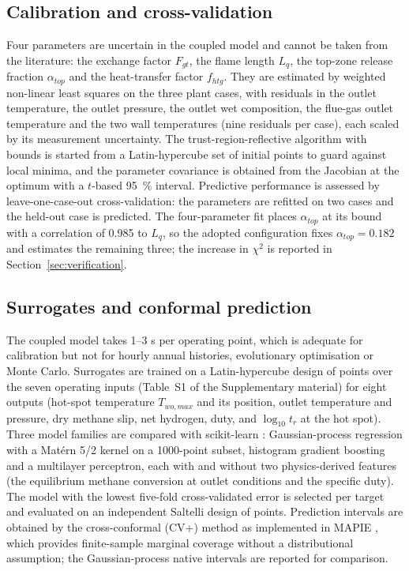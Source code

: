 \subsection{Calibration and cross-validation}
\label{sec:calibration}

Four parameters are uncertain in the coupled model and cannot be taken from the literature: the exchange factor $F_{gt}$, the flame
length $L_q$, the top-zone release fraction $\alpha_{top}$ and the heat-transfer factor $f_{htg}$. They are estimated by weighted
non-linear least squares on the three plant cases, with residuals in the outlet temperature, the outlet pressure, the outlet wet
composition, the flue-gas outlet temperature and the two wall temperatures (nine residuals per case), each scaled by its
measurement uncertainty. The trust-region-reflective algorithm with bounds is started from a Latin-hypercube set of initial points
to guard against local minima, and the parameter covariance is obtained from the Jacobian at the optimum with a $t$-based
\SI{95}{\percent} interval. Predictive performance is assessed by leave-one-case-out cross-validation: the parameters are refitted
on two cases and the held-out case is predicted. The four-parameter fit places $\alpha_{top}$ at its bound with a correlation of
0.985 to $L_q$, so the adopted configuration fixes $\alpha_{top} = 0.182$  and estimates
the remaining three; the increase in $\chi^2$ is reported in Section~\ref{sec:verification}.

\subsection{Surrogates and conformal prediction}
\label{sec:surrogate}

The coupled model takes 1--3 s per operating point, which is adequate for calibration but not for hourly annual histories,
evolutionary optimisation or Monte Carlo. Surrogates are trained on a Latin-hypercube design of \nLHS{} points over the seven
operating inputs (Table~S1 of the Supplementary material)  for eight
outputs (hot-spot temperature $T_{wo,max}$ and its position, outlet temperature and pressure, dry methane slip, net hydrogen, duty,
and $\log_{10} t_r$ at the hot spot). Three model families are compared with scikit-learn \cite{pedregosa2011}: Gaussian-process
regression with a Mat\'ern 5/2 kernel on a 1000-point subset, histogram gradient boosting and a multilayer perceptron, each with and
without two physics-derived features (the equilibrium methane conversion at outlet conditions and the specific duty). The model
with the lowest five-fold cross-validated error is selected per target and evaluated on an independent Saltelli design of
\nSaltelli{} points. Prediction intervals are obtained by the cross-conformal (CV+) method \cite{barber2021} as implemented in MAPIE
\cite{taquet2022}, which provides finite-sample marginal coverage without a distributional assumption; the Gaussian-process
native intervals are reported for comparison.

